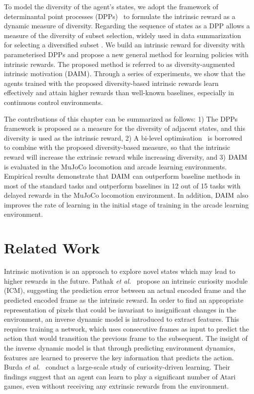 To model the diversity of the agent's states, we adopt the framework of determinantal point processes (DPPs)~\cite{kulesza2012determinantal} to formulate the intrinsic reward as a dynamic measure of diversity. Regarding the sequence of states as a DPP allows a measure of the diversity of subset selection, widely used in data summarization for selecting a diversified subset \cite{gong2014diverse}. We build an intrinsic reward for diversity with parameterised DPPs and propose a new general method for learning policies with intrinsic rewards. The proposed method is referred to as diversity-augmented intrinsic motivation ($\text{DAIM}$). Through a series of experiments, we show that the agents trained with the proposed diversity-based intrinsic rewards learn effectively and attain higher rewards than well-known baselines, especially in continuous control environments.

The contributions of this chapter can be summarized as follows: 1) The DPPs framework is proposed as a measure for the diversity of adjacent states, and this diversity is used as the intrinsic reward, 2) A bi-level optimisation~\cite{zheng2018learning} is borrowed to combine with the proposed diversity-based measure, so that the intrinsic reward will increase the extrinsic reward while increasing diversity, and 3) $\text{DAIM}$ is evaluated in the MuJoCo locomotion and arcade learning environments. Empirical results demonstrate that $\text{DAIM}$ can outperform baseline methods in most of the standard tasks and outperform baselines in 12 out of 15 tasks with delayed rewards in the MuJoCo locomotion environment. In addition, $\text{DAIM}$ also improves the rate of learning in the initial stage of training in the arcade learning environment.

\section{Related Work}
Intrinsic motivation is an approach to explore novel states which may lead to higher rewards in the future. Pathak \textit{et al.}~\cite{pathak2017curiosity} propose an intrinsic curiosity module (ICM), suggesting the prediction error between an actual encoded frame and the predicted encoded frame as the intrinsic reward.  In order to find an appropriate representation of pixels that could be invariant to insignificant changes in the environment, an inverse dynamic model is introduced to extract features. This requires training a network, which uses consecutive frames as input to predict the action that would transition the previous frame to the subsequent. The insight of the inverse dynamic model is that through predicting environment dynamics, features are learned to preserve the key information that predicts the action. Burda \textit{et al.}~\cite{burda2018largescale} conduct a large-scale study of curiosity-driven learning. Their findings suggest that an agent can learn to play a significant number of Atari games, even without receiving any extrinsic rewards from the environment. 

